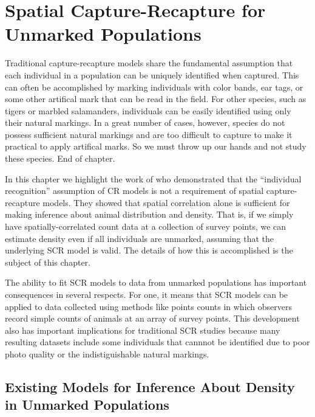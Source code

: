 


\chapter{Spatial Capture-Recapture for Unmarked Populations}
\label{chapt.scr-unmarked}

\vspace{0.3cm}


Traditional capture-recapture models share the fundamental
assumption that each individual in a population can be uniquely
identified when captured. This can often be accomplished
by marking individuals with color bands, ear tags, or some other
artifical mark that can be read in the field. For other species, such as
tigers or marbled salamanders, individuals can be easily identified
using only their natural markings. In a great number of cases, however,
species do not possess sufficient natural markings and are too
difficult to capture to make it practical to apply artifical marks. So
we must throw up our hands and not study these species. End of
chapter.

In this chapter we highlight the work of \citet{chandler_royle:2012}
who demonstrated that the ``individual recognition'' assumption of
CR models is not a requirement of spatial capture-recapture
models. They showed that spatial correlation alone is sufficient for
making inference about animal distribution and density. That is, if
we simply have spatially-correlated
count data at a collection of survey points, we can estimate density
even if all individuals are unmarked, assuming that the underlying SCR
model is valid. The details of how this is
accomplished is the subject of this chapter. 

The ability to fit
SCR models to data from unmarked populations has important
consequences in several respects. For one, it means that SCR models can
be applied to data collected using methods like points counts in which
observers record simple counts of animals at an array of survey
points. This development also has important implications for
traditional SCR studies because many resulting datasets include some
individuals that cannnot be identified due to poor photo quality or
the indistiguishable natural markings.

\section{Existing Models for Inference About Density in Unmarked Populations}

